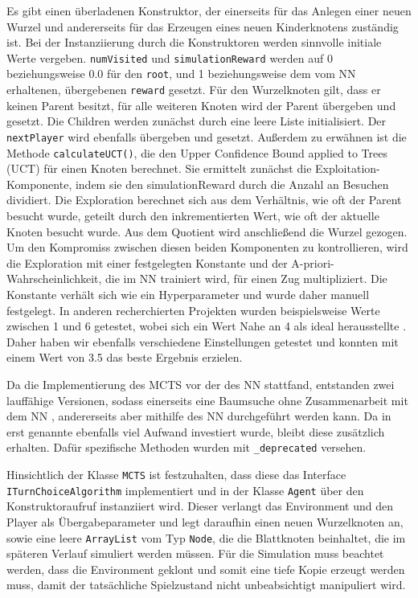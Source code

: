 \documentclass[12pt,a4paper]{article}
\begin{document}
Es gibt einen überladenen Konstruktor, der einerseits für das Anlegen einer neuen Wurzel und andererseits für das Erzeugen eines neuen Kinderknotens zuständig ist. Bei der Instanziierung durch die Konstruktoren werden sinnvolle initiale Werte vergeben. \texttt{numVisited} und \texttt{simulationReward} werden auf 0 beziehungsweise 0.0  für den \texttt{root}, und 1 beziehungsweise dem vom NN erhaltenen, übergebenen \texttt{reward} gesetzt. Für den Wurzelknoten gilt, dass er keinen Parent besitzt, für alle weiteren Knoten wird der Parent übergeben und gesetzt. Die Children werden zunächst durch eine leere Liste initialisiert. Der \texttt{nextPlayer} wird ebenfalls übergeben und gesetzt. Außerdem zu erwähnen ist die Methode \texttt{calculateUCT()}, die den Upper Confidence Bound applied to Trees (UCT) für einen Knoten berechnet. Sie ermittelt zunächst die Exploitation-Komponente, indem sie den simulationReward durch die Anzahl an Besuchen dividiert. Die Exploration berechnet sich aus dem Verhältnis, wie oft der Parent besucht wurde, geteilt durch den inkrementierten Wert, wie oft der aktuelle Knoten besucht wurde. Aus dem Quotient wird anschließend die Wurzel gezogen. Um den Kompromiss zwischen diesen beiden Komponenten zu kontrollieren, wird die Exploration mit einer festgelegten Konstante und der A-priori-Wahrscheinlichkeit, die im NN trainiert wird, für einen Zug multipliziert. Die Konstante verhält sich wie ein Hyperparameter und wurde daher manuell festgelegt. In anderen recherchierten Projekten wurden beispielsweise Werte zwischen 1 und 6 getestet, wobei sich ein Wert Nahe an 4 als ideal herausstellte \cite{MediumPart3}. Daher haben wir ebenfalls verschiedene Einstellungen getestet und konnten mit einem Wert von 3.5 das beste Ergebnis erzielen.

Da die Implementierung des MCTS vor der des NN stattfand, entstanden zwei lauffähige Versionen, sodass einerseits eine Baumsuche ohne Zusammenarbeit mit dem NN , andererseits aber mithilfe des NN durchgeführt werden kann. Da in erst genannte ebenfalls viel Aufwand investiert wurde, bleibt diese zusätzlich erhalten. Dafür spezifische Methoden wurden mit \glqq{}\texttt{\_deprecated}\grqq{} versehen.

Hinsichtlich der Klasse \texttt{MCTS} ist festzuhalten, dass diese das Interface \texttt{ITurnChoiceAlgorithm} implementiert und in der Klasse \texttt{Agent} über den Konstruktoraufruf instanziiert wird. Dieser verlangt das Environment und den Player als Übergabeparameter und legt daraufhin einen neuen Wurzelknoten an, sowie eine leere \texttt{ArrayList} vom Typ \texttt{Node}, die die Blattknoten beinhaltet, die im späteren Verlauf simuliert werden müssen. Für die Simulation muss beachtet werden, dass die Environment geklont und somit eine tiefe Kopie erzeugt werden muss, damit der tatsächliche Spielzustand nicht unbeabsichtigt manipuliert wird. 
\end{document}
